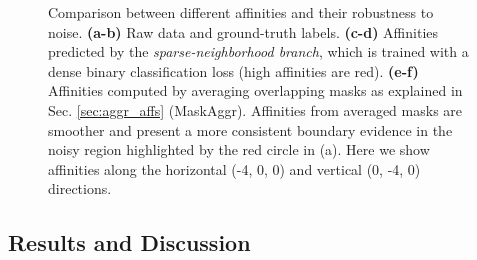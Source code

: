 \begin{figure}[t]
\caption{Comparison between different affinities and their robustness to noise. \textbf{\mbox{(a-b)}} Raw data and ground-truth labels. \textbf{(c-d)} Affinities predicted by the \emph{sparse-neighborhood branch}, which is trained with a dense binary classification loss (high affinities are red). \textbf{(e-f)} Affinities computed by averaging overlapping masks as explained in Sec. \ref{sec:aggr_affs} (MaskAggr). Affinities from averaged masks are smoother and present a more consistent boundary evidence in the noisy region highlighted by the red circle in (a). Here we show affinities along the horizontal (-4, 0, 0) and vertical (0, -4, 0) directions.}\label{fig:affs_comparison}
\end{figure}

\subsection{Results and Discussion}

